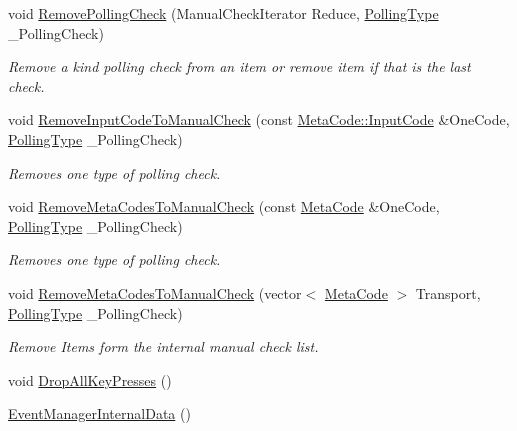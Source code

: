 \begin{DoxyCompactItemize}
void \hyperlink{structphys_1_1internal_1_1EventManagerInternalData_ab5d884b9731f79069ae4bd890dd15748}{RemovePollingCheck} (ManualCheckIterator Reduce, \hyperlink{structphys_1_1internal_1_1EventManagerInternalData_ab9ab8380b84448aacf46a63050e159af}{PollingType} \_\-PollingCheck)
\begin{DoxyCompactList}\small\item\em Remove a kind polling check from an item or remove item if that is the last check. \item\end{DoxyCompactList}\item 
void \hyperlink{structphys_1_1internal_1_1EventManagerInternalData_aadc9e786da13f2c669fc7e054d8fbf37}{RemoveInputCodeToManualCheck} (const \hyperlink{classphys_1_1MetaCode_a3e501cbb5bf0f6f1fdb7211465bda8d8}{MetaCode::InputCode} \&OneCode, \hyperlink{structphys_1_1internal_1_1EventManagerInternalData_ab9ab8380b84448aacf46a63050e159af}{PollingType} \_\-PollingCheck)
\begin{DoxyCompactList}\small\item\em Removes one type of polling check. \item\end{DoxyCompactList}\item 
void \hyperlink{structphys_1_1internal_1_1EventManagerInternalData_ade8d03121322cc467086d08df286cd51}{RemoveMetaCodesToManualCheck} (const \hyperlink{classphys_1_1MetaCode}{MetaCode} \&OneCode, \hyperlink{structphys_1_1internal_1_1EventManagerInternalData_ab9ab8380b84448aacf46a63050e159af}{PollingType} \_\-PollingCheck)
\begin{DoxyCompactList}\small\item\em Removes one type of polling check. \item\end{DoxyCompactList}\item 
void \hyperlink{structphys_1_1internal_1_1EventManagerInternalData_a54babcae1822814f09beace684f97e72}{RemoveMetaCodesToManualCheck} (vector$<$ \hyperlink{classphys_1_1MetaCode}{MetaCode} $>$ Transport, \hyperlink{structphys_1_1internal_1_1EventManagerInternalData_ab9ab8380b84448aacf46a63050e159af}{PollingType} \_\-PollingCheck)
\begin{DoxyCompactList}\small\item\em Remove Items form the internal manual check list. \item\end{DoxyCompactList}\item 
void \hyperlink{structphys_1_1internal_1_1EventManagerInternalData_ab1f4a0b147beb750deb77e000daa27cc}{DropAllKeyPresses} ()
\item 
\hypertarget{structphys_1_1internal_1_1EventManagerInternalData_a2bc6e8af4992cc8b4935f4e5b32b32a0}{
\hyperlink{structphys_1_1internal_1_1EventManagerInternalData_a2bc6e8af4992cc8b4935f4e5b32b32a0}{EventManagerInternalData} ()}
\label{structphys_1_1internal_1_1EventManagerInternalData_a2bc6e8af4992cc8b4935f4e5b32b32a0}


\end{DoxyCompactItemize}
